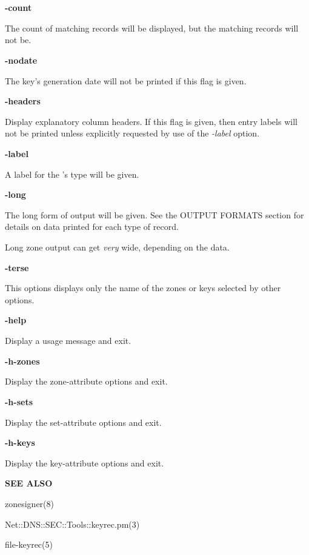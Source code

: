 \begin{description}

\item {\bf -count}\verb" "

The count of matching records will be displayed, but the matching records
will not be.

\item {\bf -nodate}\verb" "

The key's generation date will not be printed if this flag is given.

\item {\bf -headers}\verb" "

Display explanatory column headers.  If this flag is given, then entry labels
will not be printed unless explicitly requested by use of the {\it -label}
option.

\item {\bf -label}\verb" "

A label for the 's type will be given.

\item {\bf -long}\verb" "

The long form of output will be given.  See the OUTPUT FORMATS section for
details on data printed for each type of  record.

Long zone output can get {\it very} wide, depending on the data.

\item {\bf -terse}\verb" "

This options displays only the name of the zones or keys selected by other
options.

\item {\bf -help}\verb" "

Display a usage message and exit.

\item {\bf -h-zones}\verb" "

Display the zone-attribute options and exit.

\item {\bf -h-sets}\verb" "

Display the set-attribute options and exit.

\item {\bf -h-keys}\verb" "

Display the key-attribute options and exit.

\end{description}

{\bf SEE ALSO}

zonesigner(8)

Net::DNS::SEC::Tools::keyrec.pm(3)

file-keyrec(5)

